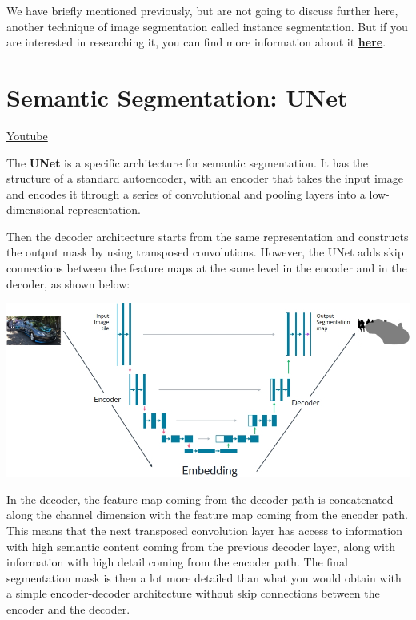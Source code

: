 We have briefly mentioned previously, but are not going to discuss further here, another technique of image segmentation called instance segmentation. But if you are interested in researching it, you can find more information about it \href{https://debuggercafe.com/instance-segmentation-with-pytorch-and-mask-r-cnn/}{\textbf{here}}.

\section{Semantic Segmentation: UNet}
\href{https://www.youtube.com/watch?v=48yJpOsGlpY&t=26s&ab_channel=Udacity}{Youtube} \newline

The \textbf{UNet} is a specific architecture for semantic segmentation. It has the structure of a standard autoencoder, with an encoder that takes the input image and encodes it through a series of convolutional and pooling layers into a low-dimensional representation. \newline

Then the decoder architecture starts from the same representation and constructs the output mask by using transposed convolutions. However, the UNet adds skip connections between the feature maps at the same level in the encoder and in the decoder, as shown below:

\includegraphics[width=1\linewidth]{img//cnn//object/unet.jpeg}

In the decoder, the feature map coming from the decoder path is concatenated along the channel dimension with the feature map coming from the encoder path. This means that the next transposed convolution layer has access to information with high semantic content coming from the previous decoder layer, along with information with high detail coming from the encoder path. The final segmentation mask is then a lot more detailed than what you would obtain with a simple encoder-decoder architecture without skip connections between the encoder and the decoder. \newline

